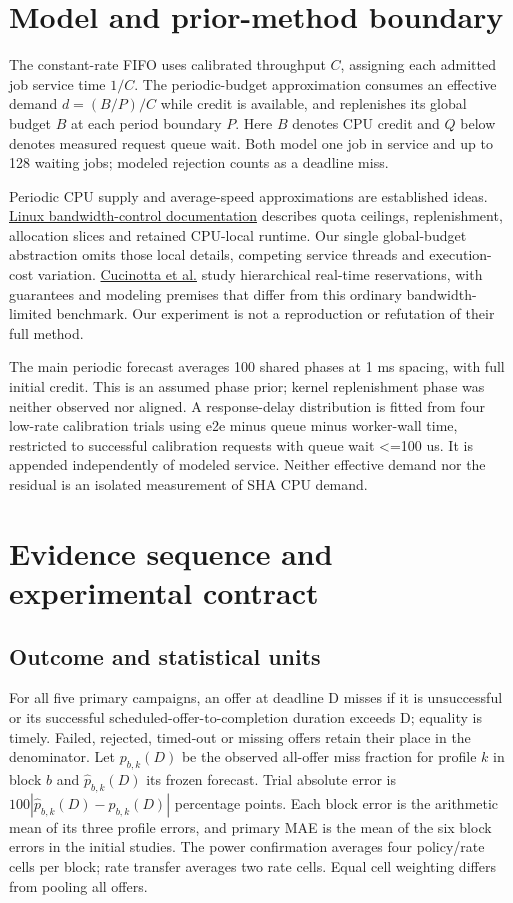 \documentclass[11pt,a4paper]{article}
\begin{document}
\section{Model and prior-method boundary}

The constant-rate FIFO uses calibrated throughput $C$, assigning each admitted
job service time $1/C$. The periodic-budget approximation consumes an effective
demand $d = (B/P)/C$ while credit is available, and replenishes its global budget
$B$ at each period boundary $P$. Here $B$ denotes CPU credit and $Q$ below denotes
measured request queue wait. Both model one job in service and up to 128 waiting
jobs; modeled rejection counts as a deadline miss.

Periodic CPU supply and average-speed approximations are established ideas.
\href{https://docs.kernel.org/scheduler/sched-bwc.html}{Linux bandwidth-control documentation}
describes quota ceilings, replenishment, allocation slices and retained
CPU-local runtime. Our single global-budget abstraction omits those local
details, competing service threads and execution-cost variation.
\href{https://retis.santannapisa.it/people/nino/publication/TCC23.pdf}{Cucinotta et al.}
study hierarchical real-time reservations, with guarantees and modeling
premises that differ from this ordinary bandwidth-limited benchmark. Our
experiment is not a reproduction or refutation of their full method.

The main periodic forecast averages 100 shared phases at 1 ms spacing, with
full initial credit. This is an assumed phase prior; kernel replenishment phase
was neither observed nor aligned. A response-delay distribution is fitted
from four low-rate calibration trials using e2e minus queue minus worker-wall
time, restricted to successful calibration requests with queue wait <=100 us.
It is appended independently of modeled service. Neither effective demand nor
the residual is an isolated measurement of SHA CPU demand.

\section{Evidence sequence and experimental contract}

\subsection{Outcome and statistical units}

For all five primary campaigns, an offer at deadline D misses if
it is unsuccessful or its successful
scheduled-offer-to-completion duration exceeds D; equality is timely. Failed,
rejected, timed-out or missing offers retain their place in the denominator.
Let $p_{b,k}(D)$ be the observed all-offer miss fraction for profile $k$ in block $b$
and $\hat p_{b,k}(D)$ its frozen forecast. Trial absolute error is
$100\left|\hat p_{b,k}(D)-p_{b,k}(D)\right|$ percentage points. Each block error is the
arithmetic mean of its three profile errors, and primary MAE is the mean of
the six block errors in the initial studies. The power confirmation averages
four policy/rate cells per block; rate transfer averages two rate cells. Equal
cell weighting differs from pooling all offers.
\end{document}
